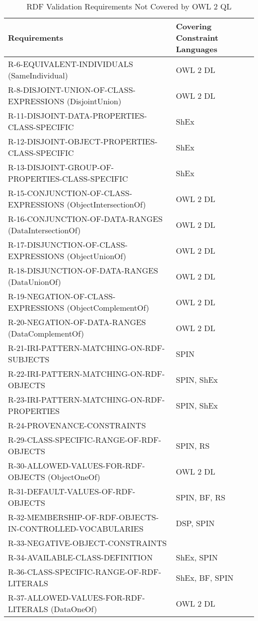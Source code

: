 \documentclass{llncs}
\newcommand{\hr}{\hline\noalign{\smallskip}} %
\begin{document}
\begin{table}
\caption{RDF Validation Requirements Not Covered by OWL 2 QL}
\label{tab:RequirementsNotCoveredOWL2QL-1}
\centering
\begin{tabular}{ll}
\hr
Requirements & Covering Constraint Languages \\
\hr
R-6-EQUIVALENT-INDIVIDUALS (SameIndividual) & OWL 2 DL \\
R-8-DISJOINT-UNION-OF-CLASS-EXPRESSIONS (DisjointUnion) & OWL 2 DL \\
R-11-DISJOINT-DATA-PROPERTIES-CLASS-SPECIFIC & ShEx \\
R-12-DISJOINT-OBJECT-PROPERTIES-CLASS-SPECIFIC & ShEx \\
R-13-DISJOINT-GROUP-OF-PROPERTIES-CLASS-SPECIFIC & ShEx \\
R-15-CONJUNCTION-OF-CLASS-EXPRESSIONS (ObjectIntersectionOf) & OWL 2 DL \\
R-16-CONJUNCTION-OF-DATA-RANGES (DataIntersectionOf) & OWL 2 DL \\
R-17-DISJUNCTION-OF-CLASS-EXPRESSIONS (ObjectUnionOf) & OWL 2 DL \\
R-18-DISJUNCTION-OF-DATA-RANGES (DataUnionOf) & OWL 2 DL \\
R-19-NEGATION-OF-CLASS-EXPRESSIONS (ObjectComplementOf) & OWL 2 DL \\
R-20-NEGATION-OF-DATA-RANGES (DataComplementOf) & OWL 2 DL \\
R-21-IRI-PATTERN-MATCHING-ON-RDF-SUBJECTS & SPIN \\
R-22-IRI-PATTERN-MATCHING-ON-RDF-OBJECTS & SPIN, ShEx \\
R-23-IRI-PATTERN-MATCHING-ON-RDF-PROPERTIES & SPIN, ShEx \\
R-24-PROVENANCE-CONSTRAINTS & \\
R-29-CLASS-SPECIFIC-RANGE-OF-RDF-OBJECTS & SPIN, RS \\
R-30-ALLOWED-VALUES-FOR-RDF-OBJECTS (ObjectOneOf) & OWL 2 DL \\
R-31-DEFAULT-VALUES-OF-RDF-OBJECTS & SPIN, BF, RS \\
R-32-MEMBERSHIP-OF-RDF-OBJECTS-IN-CONTROLLED-VOCABULARIES & DSP, SPIN \\
R-33-NEGATIVE-OBJECT-CONSTRAINTS \\
R-34-AVAILABLE-CLASS-DEFINITION & ShEx, SPIN \\
R-36-CLASS-SPECIFIC-RANGE-OF-RDF-LITERALS & ShEx, BF, SPIN \\
R-37-ALLOWED-VALUES-FOR-RDF-LITERALS (DataOneOf) & OWL 2 DL \\

\end{tabular}
\end{table}
\end{document}
